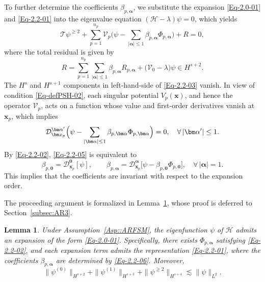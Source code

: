 \documentclass{sn-jnl}%
\numberwithin{equation}{section}
\theoremstyle{thmstyleone}%
\newtheorem{lemma}{Lemma}[section]%
\theoremstyle{thmstyletwo}%
\theoremstyle{thmstylethree}%
\begin{document}
To further determine the coefficients $\beta_{p,\bm \alpha}$, we substitute the expansion \eqref{Eq-2.0-01} and \eqref{Eq-2.2-01} into the eigenvalue equation $(\mathcal{H}-\lambda)\psi = 0$,  which yields
\begin{equation}
\label{Eq-2.2-03}
    \mathcal{T}\psi^{\geq 2} + \sum_{p=1}^{n_p}\mathcal{V}_p\bigl(\psi - \sum_{|\bm \alpha|\leq 1}\beta_{p,\bm \alpha}\Phi_{p,\bm \alpha} \bigr) +R=0,
\end{equation}
where the total residual is given by
\begin{equation}\label{Eq-2.2-04}
R = \sum_{p=1}^{n_p}\sum_{|\bm \alpha|\leq 1}\beta_{p,\bm \alpha}R_{p,\bm \alpha}+\bigl(\mathcal{V}_{0}-\lambda\bigr)\psi \in H^{s+2}.     
\end{equation}
 The $H^{s}$ and $H^{s+1}$ components in left-hand-side of \eqref{Eq-2.2-03} vanish. In view of condition \eqref{Eq-defPSH-02}, each singular potential $V_p(\bm x)$, and hence the operator $\mathcal{V}_p$, acts on a function whose value and first-order derivatives vanish at $\bm x_p$, which implies
\begin{equation}\label{Eq-2.2-05}
    \mathcal{D}^{\bm \alpha'}_{\bm x_p} \Bigl(\psi - \sum_{|\bm \alpha|\leq 1}\beta_{p,\bm \alpha}\Phi_{p,\bm \alpha} \Bigr) =0,\quad  \forall\, |\bm \alpha'|\leq 1.
\end{equation}
By \eqref{Eq-2.2-02},  \eqref{Eq-2.2-05} is equivalent to
\begin{equation}\label{Eq-2.2-06}
    \beta_{p,\bm 0} = \mathcal{D}^{\bm 0}_{\bm x_p}[\psi],\qquad
    \beta_{p,\bm \alpha}=\mathcal{D}^{\bm \alpha}_{\bm x_p}\bigl[\psi-\beta_{p,\bm 0}\Phi_{p,\bm 0}\big],\quad \forall\, |\bm \alpha|=1.
\end{equation}
This implies that the coefficients are invariant  with respect to the expansion order. 

The proceeding argument is formalized in Lemma~\ref{Lem2.1}, whose proof is deferred to Section~\ref{subsec:AR3}.
\begin{lemma}%
\label{Lem2.1}
    Under Assumption~\ref{Asp::ARFSM}, the eigenfunction $\psi$ of $\mathcal{H}$ admits an expansion of the form \eqref{Eq-2.0-01}. Specifically, there exists $\Phi_{p,\bm \alpha}$ satisfying \eqref{Eq-2.2-02}, and each expansion term  admits the representation \eqref{Eq-2.2-01}, where the coefficients $\beta_{p,\bm \alpha}$ are determined by \eqref{Eq-2.2-06}. Moreover,
     \begin{equation}
     \|\psi^{(0)}\|_{H^{s+2}}+ 
     \|\psi^{(1)}\|_{H^{s+3}}+ 
     \|\psi^{\geq 2}\|_{H^{s+4}} \lesssim \|\psi\|_{L^2}.
     \end{equation}
\end{lemma}
\end{document}
